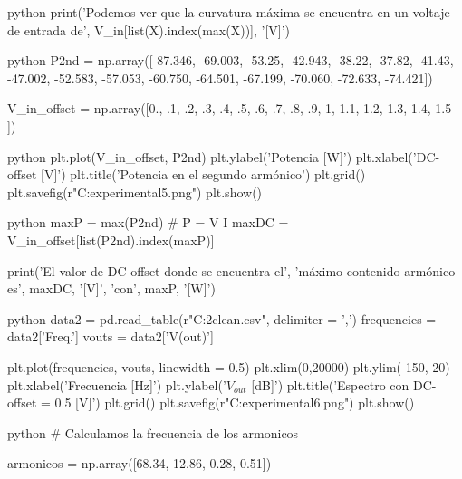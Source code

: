 \begin{sourcecode}[\label{codigo-python}]{python}
print('Podemos ver que la curvatura máxima se encuentra en un voltaje de entrada de', V_in[list(X).index(max(X))], '[V]')
\end{sourcecode}

\begin{sourcecode}[\label{codigo-python}]{python}
P2nd = np.array([-87.346, -69.003, -53.25, -42.943,
                  -38.22, -37.82, -41.43, -47.002,
                  -52.583, -57.053, -60.750, -64.501,
                  -67.199, -70.060, -72.633, -74.421])

V_in_offset = np.array([0., .1, .2, .3, .4, .5, .6, .7, .8,
                     .9, 1, 1.1, 1.2, 1.3, 1.4, 1.5 ])
\end{sourcecode}

\begin{sourcecode}[\label{codigo-python}]{python}
plt.plot(V_in_offset, P2nd)
plt.ylabel('Potencia [W]')
plt.xlabel('DC-offset [V]')
plt.title('Potencia en el segundo armónico')
plt.grid()
plt.savefig(r"C:\Users\Usuario\Documents\Astro experimental\graf5.png")
plt.show()
\end{sourcecode}

\begin{sourcecode}[\label{codigo-python}]{python}
maxP = max(P2nd) # P = V \cdot I
maxDC = V_in_offset[list(P2nd).index(maxP)]

print('El valor de DC-offset donde se encuentra el',
      'máximo contenido armónico es', maxDC, '[V]',
      'con', maxP, '[W]')
\end{sourcecode}

\begin{sourcecode}[\label{codigo-python}]{python}
data2 = pd.read_table(r"C:\Users\Usuario\Downloads\circuito2clean.csv", delimiter = ',')
frequencies = data2['Freq.'] 
vouts = data2['V(out)']

plt.plot(frequencies, vouts, linewidth = 0.5)
plt.xlim(0,20000)
plt.ylim(-150,-20)
plt.xlabel('Frecuencia [Hz]')
plt.ylabel('$V_{out}$ [dB]')
plt.title('Espectro con DC-offset = 0.5 [V]')
plt.grid()
plt.savefig(r"C:\Users\Usuario\Documents\Astro experimental\graf6.png")
plt.show()
\end{sourcecode}

\begin{sourcecode}[\label{codigo-python}]{python}
# Calculamos la frecuencia de los armonicos

armonicos = np.array([68.34, 12.86, 0.28, 0.51])
\end{sourcecode}

